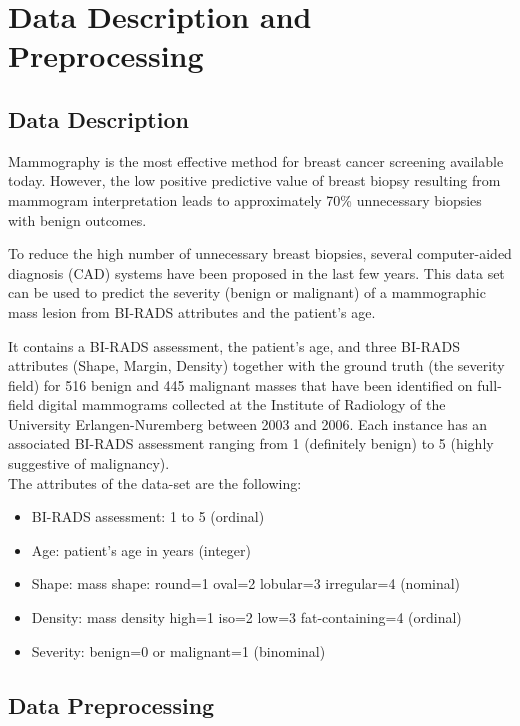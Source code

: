 \documentclass[conference]{IEEEtran}
\begin{document}
\section{Data Description and Preprocessing}
\subsection{Data Description}

Mammography is the most effective method for breast cancer \cite{mammographymosteffectivemethod} \cite{mammographybestmethod} screening available today. However, the low positive predictive value of breast biopsy resulting from mammogram interpretation leads to approximately 70\% unnecessary biopsies with benign outcomes. 

To reduce the high number of unnecessary breast biopsies, several computer-aided diagnosis (CAD) systems have been proposed in the last few years. This data set \cite{dataset} can be used to predict the severity (benign or malignant) of a mammographic mass lesion from BI-RADS attributes and the patient's age.

It contains a BI-RADS assessment, the patient's age, and three BI-RADS attributes (Shape, Margin, Density) together with the ground truth (the severity field) for 516 benign and 445 malignant masses that have been identified on full-field digital mammograms collected at the Institute of Radiology of the University Erlangen-Nuremberg between 2003 and 2006. Each instance has an associated BI-RADS assessment ranging from 1 (definitely benign) to 5 (highly suggestive of malignancy).\\
The attributes of the data-set are the following:
\begin{itemize}
  \item BI-RADS assessment: 1 to 5 (ordinal)  
  \item Age: patient's age in years (integer)
  \item Shape: mass shape: round=1 oval=2 lobular=3 irregular=4 (nominal)
  \item Density: mass density high=1 iso=2 low=3 fat-containing=4 (ordinal)
  \item Severity: benign=0 or malignant=1 (binominal)
\end{itemize}

\subsection{Data Preprocessing}
\end{document}
